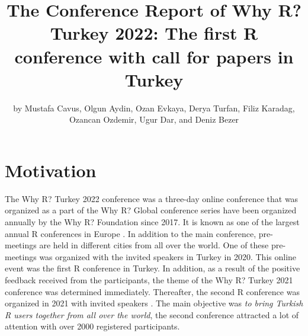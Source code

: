 \title{The Conference Report of Why R? Turkey 2022: The first R conference with call for papers in Turkey}
\author{by Mustafa Cavus, Olgun Aydin, Ozan Evkaya, Derya Turfan, Filiz Karadag, Ozancan Ozdemir, Ugur Dar, and Deniz Bezer}

\maketitle

\section{Motivation}

The Why R? Turkey 2022 conference was a three-day online conference that was organized as a part of the Why R? Global conference series have been organized annually by the Why R? Foundation since 2017. It is known as one of the largest annual R conferences in Europe \citep{burdukiewicz2018, burdukiewicz2019}. In addition to the main conference, pre-meetings are held in different cities from all over the world. One of these pre-meetings was organized with the invited speakers in Turkey in 2020. This online event was the first R conference in Turkey. In addition, as a result of the positive feedback received from the participants, the theme of the Why R? Turkey 2021 conference was determined immediately. Thereafter, the second R conference was organized in 2021 with invited speakers \citep{cavus2021}. The main objective was \textit{to bring Turkish R users together from all over the world}, the second conference attracted a lot of attention with over 2000 registered participants. 


